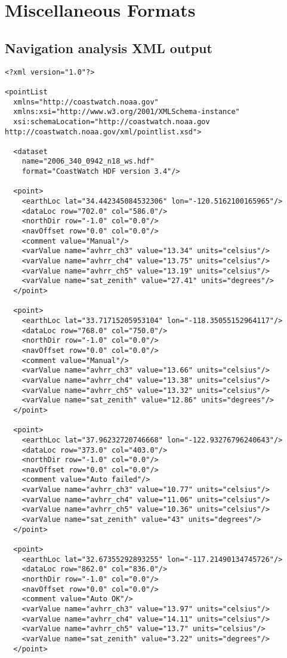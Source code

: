 \chapter{Miscellaneous Formats}
\label{misc_formats}

\section{Navigation analysis XML output}
\label{nav_xml}

\begin{verbatim}
<?xml version="1.0"?>

<pointList
  xmlns="http://coastwatch.noaa.gov"
  xmlns:xsi="http://www.w3.org/2001/XMLSchema-instance"
  xsi:schemaLocation="http://coastwatch.noaa.gov http://coastwatch.noaa.gov/xml/pointlist.xsd">

  <dataset 
    name="2006_340_0942_n18_ws.hdf"
    format="CoastWatch HDF version 3.4"/>

  <point>
    <earthLoc lat="34.442345084532306" lon="-120.5162100165965"/>
    <dataLoc row="702.0" col="586.0"/>
    <northDir row="-1.0" col="0.0"/>
    <navOffset row="0.0" col="0.0"/>
    <comment value="Manual"/>
    <varValue name="avhrr_ch3" value="13.34" units="celsius"/>
    <varValue name="avhrr_ch4" value="13.75" units="celsius"/>
    <varValue name="avhrr_ch5" value="13.19" units="celsius"/>
    <varValue name="sat_zenith" value="27.41" units="degrees"/>
  </point>

  <point>
    <earthLoc lat="33.71715205953104" lon="-118.35055152964117"/>
    <dataLoc row="768.0" col="750.0"/>
    <northDir row="-1.0" col="0.0"/>
    <navOffset row="0.0" col="0.0"/>
    <comment value="Manual"/>
    <varValue name="avhrr_ch3" value="13.66" units="celsius"/>
    <varValue name="avhrr_ch4" value="13.38" units="celsius"/>
    <varValue name="avhrr_ch5" value="13.32" units="celsius"/>
    <varValue name="sat_zenith" value="12.86" units="degrees"/>
  </point>

  <point>
    <earthLoc lat="37.96232720746668" lon="-122.93276796240643"/>
    <dataLoc row="373.0" col="403.0"/>
    <northDir row="-1.0" col="0.0"/>
    <navOffset row="0.0" col="0.0"/>
    <comment value="Auto failed"/>
    <varValue name="avhrr_ch3" value="10.77" units="celsius"/>
    <varValue name="avhrr_ch4" value="11.06" units="celsius"/>
    <varValue name="avhrr_ch5" value="10.36" units="celsius"/>
    <varValue name="sat_zenith" value="43" units="degrees"/>
  </point>

  <point>
    <earthLoc lat="32.67355292893255" lon="-117.21490134745726"/>
    <dataLoc row="862.0" col="836.0"/>
    <northDir row="-1.0" col="0.0"/>
    <navOffset row="0.0" col="0.0"/>
    <comment value="Auto OK"/>
    <varValue name="avhrr_ch3" value="13.97" units="celsius"/>
    <varValue name="avhrr_ch4" value="14.11" units="celsius"/>
    <varValue name="avhrr_ch5" value="13.7" units="celsius"/>
    <varValue name="sat_zenith" value="3.22" units="degrees"/>
  </point>


\end{verbatim}
